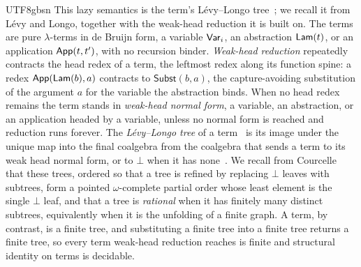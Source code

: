 \begin{CJK*}{UTF8}{gbsn}
  This lazy semantics is the term's L\'evy--Longo tree~\cite{longo1983-set-theoretical-models, levy1978-reductions-lambda-calcul}; we recall it from L\'evy and Longo, together with the weak-head reduction it is built on. The terms are pure $\lambda$-terms in de Bruijn form, a variable $\mathsf{Var}_i$, an abstraction $\mathsf{Lam}(t)$, or an application $\mathsf{App}(t, t')$, with no recursion binder. \emph{Weak-head reduction} repeatedly contracts the head redex of a term, the leftmost redex along its function spine: a redex $\mathsf{App}(\mathsf{Lam}(b), a)$ contracts to $\textsf{Subst}(b, a)$, the capture-avoiding substitution of the argument $a$ for the variable the abstraction binds. When no head redex remains the term stands in \emph{weak-head normal form}, a variable, an abstraction, or an application headed by a variable, unless no normal form is reached and reduction runs forever. The \emph{L\'evy--Longo tree} of a term~\cite{barendregt1984-lambda-calculus, wadsworth1971-semantics-lambda-calculus, abramsky1993-full-abstraction-lazy-lambda} is its image under the unique map into the final coalgebra from the coalgebra that sends a term to its weak head normal form, or to $\bot$ when it has none~\cite{kurz2013-nominal-coalgebraic-data-types}. We recall from Courcelle~\cite{courcelle1983-infinite-trees} that these trees, ordered so that a tree is refined by replacing $\bot$ leaves with subtrees, form a pointed $\omega$-complete partial order whose least element is the single $\bot$ leaf, and that a tree is \emph{rational} when it has finitely many distinct subtrees, equivalently when it is the unfolding of a finite graph. A term, by contrast, is a finite tree, and substituting a finite tree into a finite tree returns a finite tree, so every term weak-head reduction reaches is finite and structural identity on terms is decidable.
  \fi


\end{CJK*}

